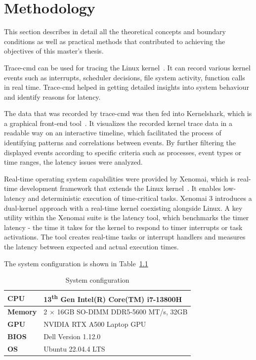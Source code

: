 \documentclass[MMR,Master,english]{twbook}
\begin{document}
\clearpage


\chapter{Methodology}\label{cha:methodology}

This section describes in detail all the theoretical concepts and boundary conditions as well as practical methods that contributed to achieving the objectives of this master's thesis.

\bigskip \noindent Trace-cmd can be used for tracing the Linux kernel~\cite{Tracecmd}. It can record various kernel events such as interrupts, scheduler decisions, file system activity, function calls in real time. Trace-cmd helped in getting detailed insights into system behaviour and identify reasons for latency.

\bigskip \noindent The data that was recorded by trace-cmd was then fed into Kernelshark, which is a graphical front-end tool~\cite{KernelShark}. It visualizes the recorded kernel trace data in a readable way on an interactive timeline, which facilitated the process of identifying patterns and correlations between events. By further filtering the displayed events according to specific criteria such as processes, event types or time ranges, the latency issues were analyzed.

\bigskip \noindent Real-time operating system capabilities were provided by Xenomai, which is real-time development framework that extends the Linux kernel~\cite{XenomaiXenomai}. It enables low-latency and deterministic execution of time-critical tasks. Xenomai 3 introduces a dual-kernel approach with a real-time kernel coexisting alongside Linux. A key utility within the Xenomai suite is the latency tool, which benchmarks the timer latency - the time it takes for the kernel to respond to timer interrupts or task activations. The tool creates real-time tasks or interrupt handlers and measures the latency between expected and actual execution times.

The system configuration is shown in Table~\ref{tab:testbed_configuration}

\begin{table}[H]
	\centering
	\caption[System configuration]{System configuration}
	\label{tab:testbed_configuration}
	\setlength{\tabcolsep}{0.5em} %
	{\renewcommand{\arraystretch}{1.2}%
		\begin{tabular}{|l|l|}
			\hline
			\textbf{CPU}    & 13\textsuperscript{th} Gen Intel(R) Core(TM) i7-13800H \\ \hline
			\textbf{Memory} & 2 $\times$ 16GB SO-DIMM DDR5-5600 MT/s, 32GB           \\ \hline
			\textbf{GPU}    & NVIDIA RTX A500 Laptop GPU                             \\ \hline
			\textbf{BIOS}   & Dell Version 1.12.0                                    \\ \hline
			\textbf{OS}     & Ubuntu 22.04.4 LTS                                     \\
			\hline
		\end{tabular}}
\end{table}
\end{document}
